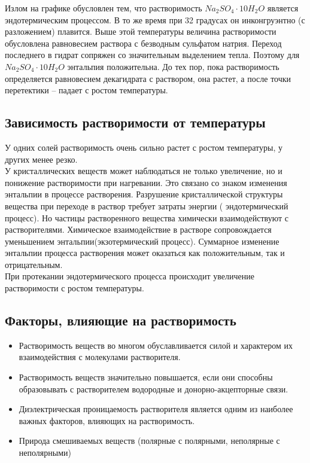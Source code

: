 \documentclass[14pt,a4paper]{scrartcl}
\begin{document}
Излом на графике обусловлен тем, что растворимость $Na_2SO_4\cdot10H_2O$ является эндотермическим процессом. В то же время при 32 градусах он инконгруэнтно (с разложением) плавится. Выше этой температуры величина растворимости обусловлена равновесием раствора с безводным сульфатом натрия. Переход последнего в гидрат сопряжен со значительным выделением тепла.  Поэтому для $Na_2SO_4\cdot10H_2O$ энтальпия положительна. До тех пор, пока растворимость определяется равновесием декагидрата с раствором, она растет, а после точки перетектики – падает с ростом температуры.

\subsection*{Зависимость растворимости от температуры}

У одних солей растворимость очень сильно растет с ростом температуры, у других менее резко. \\
У кристаллических веществ может наблюдаться не только увеличение, но и понижение растворимости при нагревании. Это связано со знаком изменения энтальпии в процессе
растворения. Разрушение кристаллической структуры вещества при переходе в раствор требует затраты энергии ( эндотермический процесс). Но частицы растворенного вещества химически взаимодействуют с растворителями. Химическое взаимодействие в растворе сопровождается уменьшением энтальпии(экзотермический процесс). Суммарное изменение энтальпии процесса растворения может оказаться как положительным, так и отрицательным. \\
При протекании эндотермического процесса происходит увеличение растворимости с ростом температуры.

\subsection*{Факторы, влияющие на растворимость}
\begin{itemize}
\item Растворимость веществ во многом обуславливается силой и характером их взаимодействия с молекулами растворителя.

\item Растворимость веществ значительно повышается, если они способны образовывать с растворителем водородные и донорно-акцепторные связи.

\item Диэлектрическая проницаемость растворителя является одним из наиболее важных факторов, влияющих на растворимость.

\item Природа смешиваемых веществ (полярные с полярными, неполярные с неполярными)
\end{itemize}
\end{document}
